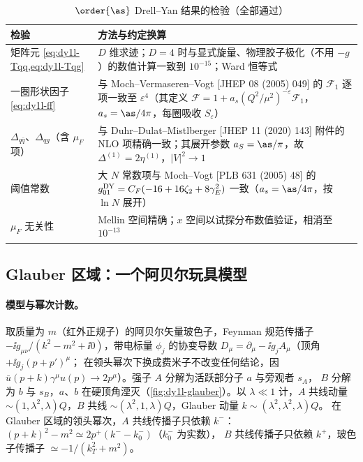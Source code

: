 \begin{table}[htbp]
\centering
\caption{$\order{\as}$ Drell--Yan 结果的检验（全部通过）}
\label{tab:dy1l-checks}
\small
\begin{tabularx}{\textwidth}{>{\raggedright\arraybackslash}p{4.3cm}X}
\toprule
检验 & 方法与约定换算\\
\midrule
矩阵元 \cref{eq:dy1l-Tqq,eq:dy1l-Tqg} & $D$ 维求迹；$D=4$ 时与显式旋量、物理胶子极化（不用 $-g$）的数值计算一致到 $10^{-15}$；Ward 恒等式\\
一圈形状因子 \cref{eq:dy1l-ff} & 与 Moch--Vermaseren--Vogt [JHEP 08 (2005) 049] 的 $\mathcal F_1$ 逐项一致至 $\varepsilon^4$（其定义 $\mathcal F=1+a_s(Q^2/\mu^2)^{-\varepsilon}\mathcal F_1$，$a_s=\as/4\pi$，每圈吸收 $S_\varepsilon$）\\
$\Delta_{q\bar q}$、$\Delta_{qg}$（含 $\mu_F$ 项）& 与 Duhr--Dulat--Mistlberger [JHEP 11 (2020) 143] 附件的 NLO 项精确一致；其展开参数 $a_S=\as/\pi$，故 $\Delta^{(1)}=2\eta^{(1)}$，$|V|^2\to1$\\
阈值常数 & 大 $N$ 常数项与 Moch--Vogt [PLB 631 (2005) 48] 的 $g_{01}^{\rm DY}=C_F(-16+16\zeta_2+8\gamma_E^2)$ 一致（$a_s=\as/4\pi$，按 $\ln N$ 展开）\\
$\mu_F$ 无关性 & Mellin 空间精确；$x$ 空间以试探分布数值验证，相消至 $10^{-13}$\\
\bottomrule
\end{tabularx}
\end{table}

\subsection{Glauber 区域：一个阿贝尔玩具模型}
\label{sec:dy1l-glauber}

\paragraph{模型与幂次计数。}取质量为 $m$（红外正规子）的阿贝尔矢量玻色子，Feynman 规范传播子
$-\ii g_{\mu\nu}/(k^2-m^2+\ii0)$，带电标量 $\phi_j$ 的协变导数 $D_\mu=\partial_\mu-\ii g_jA_\mu$（顶角 $+\ii g_j(p+p')^\mu$；
在领头幂次下换成费米子不改变任何结论，因 $\bar u(p+k)\gamma^\mu u(p)\to2p^\mu$）。强子 $A$ 分解为活跃部分子 $a$ 与旁观者 $s_A$，
$B$ 分解为 $b$ 与 $s_B$，$a$、$b$ 在硬顶角湮灭（\cref{fig:dy1l-glauber}）。以 $\lambda\ll1$ 计，$A$ 共线动量
$\sim(1,\lambda^2,\lambda)Q$，$B$ 共线 $\sim(\lambda^2,1,\lambda)Q$，Glauber 动量 $k\sim(\lambda^2,\lambda^2,\lambda)Q$。
在 Glauber 区域的领头幂次，$A$ 共线传播子只依赖 $k^-$：$(p+k)^2-m^2\simeq2p^+(k^--k_0^-)$（$k_0^-$ 为实数），
$B$ 共线传播子只依赖 $k^+$，玻色子传播子 $\simeq-1/(k_T^2+m^2)$。

